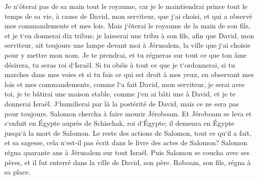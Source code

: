 \verse Je n`ôterai pas de sa main tout le royaume, car je le maintiendrai prince tout le temps de sa vie, à cause de David, mon serviteur, que j`ai choisi, et qui a observé mes commandements et mes lois. 
\verse Mais j`ôterai le royaume de la main de son fils, et je t`en donnerai dix tribus; 
\verse je laisserai une tribu à son fils, afin que David, mon serviteur, ait toujours une lampe devant moi à Jérusalem, la ville que j`ai choisie pour y mettre mon nom. 
\verse Je te prendrai, et tu régneras sur tout ce que ton âme désirera, tu seras roi d`Israël. 
\verse Si tu obéis à tout ce que je t`ordonnerai, si tu marches dans mes voies et si tu fais ce qui est droit à mes yeux, en observant mes lois et mes commandements, comme l`a fait David, mon serviteur, je serai avec toi, je te bâtirai une maison stable, comme j`en ai bâti une à David, et je te donnerai Israël. 
\verse J`humilierai par là la postérité de David, mais ce ne sera pas pour toujours. 
\verse Salomon chercha à faire mourir Jéroboam. Et Jéroboam se leva et s`enfuit en Égypte auprès de Schischak, roi d`Égypte; il demeura en Égypte jusqu`à la mort de Salomon. 
\verse Le reste des actions de Salomon, tout ce qu`il a fait, et sa sagesse, cela n`est-il pas écrit dans le livre des actes de Salomon? 
\verse Salomon régna quarante ans à Jérusalem sur tout Israël. 
\verse Puis Salomon se coucha avec ses pères, et il fut enterré dans la ville de David, son père. Roboam, son fils, régna à sa place. 

\chapter{}

